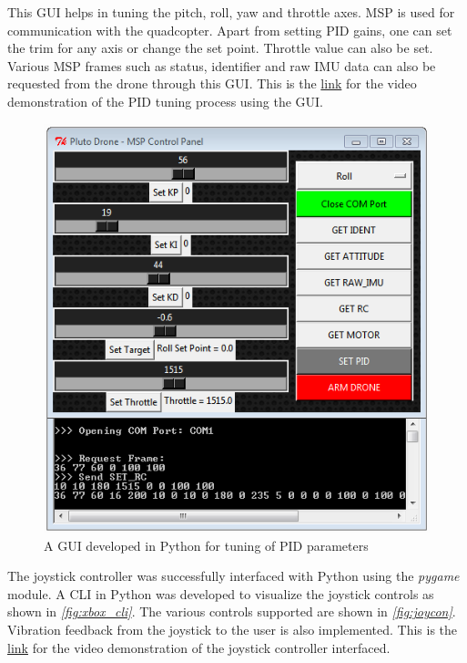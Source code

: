\documentclass[a4paper,12pt,oneside]{book}
\begin{document}
{This GUI helps in tuning the pitch, roll, yaw and throttle axes. MSP is used for communication with the quadcopter. Apart from setting PID gains, one can set the trim for any axis or change the set point. Throttle value can also be set. Various MSP frames such as status, identifier and raw IMU data can also be requested from the drone through this GUI. This is the \href{https://youtu.be/YL5i_DfhHuk}{link} for the video demonstration of the PID tuning process using the GUI.\\ 

\begin{figure}[!htb]
\centering
\includegraphics[width=\textwidth]{images/pid_gui}
\caption{A GUI developed in Python for tuning of PID parameters}
\label{fig:pid_gui}
\end{figure}

\clearpage

The joystick controller was successfully interfaced with Python using the \textit{pygame} module. A CLI in Python was developed to visualize the joystick controls as shown in \textit{\autoref{fig:xbox_cli}}. The various controls supported are shown in \textit{\autoref{fig:joycon}}. Vibration feedback from the joystick to the user is also implemented. This is the \href{https://youtu.be/l0V4xfjGFts}{link} for the video demonstration of the joystick controller interfaced.\\

}
\end{document}
